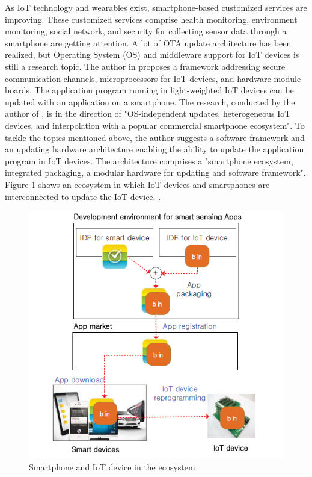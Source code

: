 \documentclass[12pt,a4paper]{article}
\begin{document}
As IoT technology and wearables exist, smartphone-based customized services are improving. These customized services comprise health monitoring, environment monitoring, social network, and security for collecting sensor data through a smartphone are getting attention. A lot of OTA update architecture has been realized, but Operating System (OS) and middleware support for IoT devices is still a research topic. The author in \cite{r29} proposes a framework addressing secure communication channels, microprocessors for IoT devices, and hardware module boards. The application program running in light-weighted IoT devices can be updated with an application on a smartphone. The research, conducted by the author of \cite{r29}, is in the direction of "OS-independent updates, heterogeneous IoT devices, and interpolation with a popular commercial smartphone ecosystem". To tackle the topics mentioned above, the author suggests a software framework and an updating hardware architecture enabling the ability to update the application program in IoT devices. The architecture comprises a "smartphone ecosystem, integrated packaging, a modular hardware for updating and software framework". Figure \ref{smarphone_ecosystem} shows an ecosystem in which IoT devices and smartphones are interconnected to update the IoT device. \cite{r29}.

\begin{figure}[H]
\centering
\includegraphics[scale=0.6]{smarphone_ecosystem.PNG}
\caption{Smartphone and IoT device in the ecosystem \cite{r29}}
\label{smarphone_ecosystem}
\end{figure}
\end{document}
